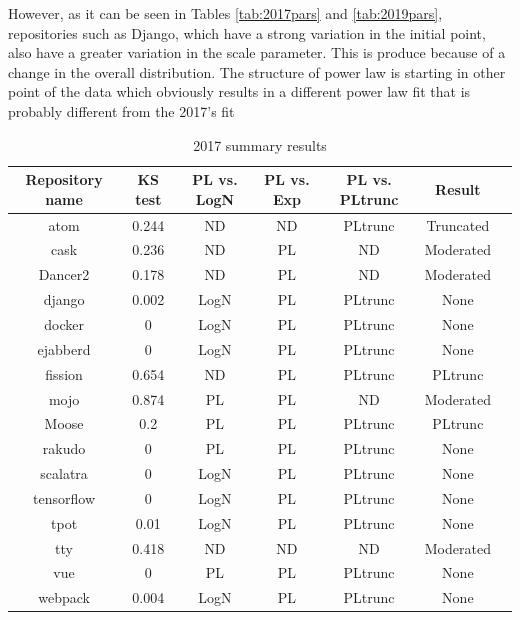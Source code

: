 \documentclass[conference]{IEEEtran}
\begin{document}
However, as it can be seen in Tables \ref{tab:2017pars} and
\ref{tab:2019pars}, repositories such as Django, which have a strong
variation in the initial point, also have a greater variation in the
scale parameter. This is produce because of a change in the overall
distribution. The structure of power law is starting in other point of
the data which obviously results in a different power law fit that is
probably different from the 2017's fit  %
%
\begin{table}[h!tbp]
	\caption{2017 summary results}
\begin{center}
	\begin{tabular}{| c |c| c | c| c |c | c |}
		\hline
		Repository name & KS test & PL vs. LogN & PL vs. Exp & PL vs. PLtrunc & Result \\ 
		\hline
		atom & 0.244 &ND & ND &PLtrunc & Truncated \\ 
		cask & 0.236 &ND & PL & ND & Moderated \\
		Dancer2 &0.178 &ND &PL &ND & Moderated \\
		django &0.002 &LogN &PL &PLtrunc &None\\
		docker &0 &LogN &PL &PLtrunc &None\\
		ejabberd &0 &LogN &PL &PLtrunc &None\\
		fission &0.654 &ND &PL &PLtrunc &PLtrunc\\
		mojo &0.874 &PL &PL &ND & Moderated \\
		Moose &0.2 &PL &PL &PLtrunc & PLtrunc\\
		rakudo &0 &PL &PL &PLtrunc & None\\
		scalatra &0 &LogN &PL &PLtrunc & None\\
		tensorflow &0 &LogN &PL &PLtrunc & None\\
		tpot &0.01 &LogN &PL &PLtrunc &None\\
		tty &0.418 &ND &ND &ND & Moderated \\
		vue &0 &PL &PL &PLtrunc & None\\
		webpack &0.004 &LogN &PL & PLtrunc & None\\
		\hline
	\end{tabular}
\end{center}
\label{tab:2017tests}
\end{table}
%
\end{document}
